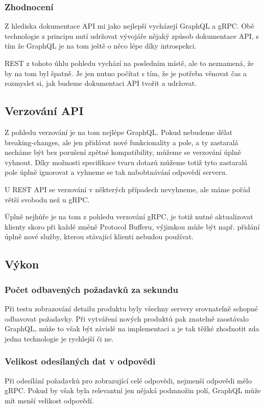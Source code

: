 \documentclass[thesis=M,czech]{FITthesis}[2019/12/23]
\begin{document}
\subsubsection*{Zhodnocení}
Z hlediska dokumentace API mi jako nejlepší vycházejí GraphQL a gRPC. Obě technologie z principu nutí udržovat vývojáře nějaký způsob dokumentace API, s tím že GraphQL je na tom ještě o něco lépe díky introspekci.

REST z tohoto úhlu pohledu vychází na posledním místě, ale to neznamená, že by na tom byl špatně. Je jen nutno počítat s tím, že je potřeba věnovat čas a rozmyslet si, jak budeme dokumentaci API tvořit a udržovat.

\subsection{Verzování API}
Z pohledu verzování je na tom nejlépe GraphQL. Pokud nebudeme dělat breaking-changes, ale jen přidávat nové funkcionality a pole, a ty zastaralá necháme být bez porušení zpětné kompatibility, můžeme se verzování úplně vyhnout. Díky možnosti specifikace tvaru dotazů můžeme totiž tyto zastaralá pole úplně ignorovat a vyhneme se tak nabobtnávání odpovědí serveru.

U REST API se verzování v některých případech nevyhneme, ale máme pořád větší svobodu než u gRPC.

Úplně nejhůře je na tom z pohledu verzování gRPC, je totiž nutné aktualizovat klienty skoro při každé změně Protocol Bufferu, výjimkou může být např. přidání úplně nové služby, kterou stávající klienti nebudou používat.

\subsection{Výkon}

\subsubsection*{Počet odbavených požadavků za sekundu}
Při testu zobrazování detailu produktu byly všechny servery srovnatelně schopné odbavovat požadavky. Při vytváření nových produktů pak znatelně zaostávalo GraphQL, může to však být závislé na implementaci a je tak těžké zhodnotit zda jedna technologie je rychlejší či ne.
\subsubsection*{Velikost odesílaných dat v odpovědi}
Při odesílání požadavků pro zobrazující celé odpovědi, nejmenší odpovědi mělo gRPC. Pokud by však byla relevantní jen nějaká podmnožin polí, GraphQL může mít menší velikost odpovědí.
\end{document}
